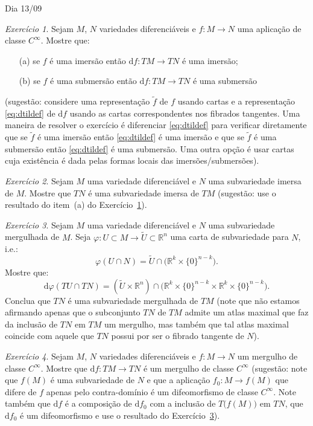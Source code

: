 \documentclass[oneside,11pt]{amsart}
\newcommand{\R}{\mathds R}
\newcommand{\dd}{\mathrm d}
\theoremstyle{remark}\newtheorem{exercise}{Exercício}[section]
\theoremstyle{plain}\newtheorem{teo}{Teorema}[section]
\theoremstyle{plain}\newtheorem{lem}[teo]{Lema}
\theoremstyle{plain}\newtheorem{prop}[teo]{Proposição}
\theoremstyle{definition}\newtheorem{defin}[teo]{Definição}
\theoremstyle{remark}\newtheorem{rem}[teo]{Observação}
\theoremstyle{definition}\newtheorem{example}[teo]{Exemplo}
\numberwithin{equation}{section}
\begin{document}
\begin{section}{Dia 13/09}
\begin{exercise}\label{exe:dimersubmer}
Sejam $M$, $N$ variedades diferenciáveis e $f:M\to N$ uma aplicação de classe $C^\infty$. Mostre que:
\begin{itemize}
\item[(a)] se $f$ é uma imersão então $\dd f:TM\to TN$ é uma imersão;
\item[(b)] se $f$ é uma submersão então $\dd f:TM\to TN$ é uma submersão
\end{itemize}
(sugestão: considere uma representação $\tilde f$ de $f$ usando cartas e a representação \eqref{eq:dtildef} de $\dd f$ usando as cartas correspondentes
nos fibrados tangentes. Uma maneira de resolver o exercício é diferenciar \eqref{eq:dtildef} para verificar diretamente que se $\tilde f$ é uma imersão
então \eqref{eq:dtildef} é uma imersão e que se $\tilde f$ é uma submersão então \eqref{eq:dtildef} é uma submersão. Uma outra opção é usar cartas cuja existência
é dada pelas formas locais das imersões/submersões).
\end{exercise}

\begin{exercise}
Sejam $M$ uma variedade diferenciável e $N$ uma subvariedade imersa de $M$. Mostre que $TN$ é uma subvariedade imersa de $TM$ (sugestão:
use o resultado do item~(a) do Exercício~\ref{exe:dimersubmer}).
\end{exercise}

\begin{exercise}\label{exe:Tsubvar}
Sejam $M$ uma variedade diferenciável e $N$ uma subvariedade mergulhada de $M$. Seja $\varphi:U\subset M\to\widetilde U\subset\R^n$ uma carta de subvariedade
para $N$, i.e.:
\[\varphi(U\cap N)=\widetilde U\cap\big(\R^k\times\{0\}^{n-k}\big).\]
Mostre que:
\[\dd\varphi(TU\cap TN)=(\widetilde U\times\R^n)\cap\big(\R^k\times\{0\}^{n-k}\times\R^k\times\{0\}^{n-k}\big).\]
Conclua que $TN$ é uma subvariedade mergulhada de $TM$ (note que não estamos afirmando apenas que o subconjunto $TN$ de $TM$ admite um atlas maximal
que faz da inclusão de $TN$ em $TM$ um mergulho, mas também que tal atlas maximal coincide com aquele que $TN$ possui por ser o fibrado tangente de $N$).
\end{exercise}

\begin{exercise}\label{exe:dmergulho}
Sejam $M$, $N$ variedades diferenciáveis e $f:M\to N$ um mergulho de classe $C^\infty$. Mostre que $\dd f:TM\to TN$ é um mergulho de classe $C^\infty$
(sugestão: note que $f(M)$ é uma subvariedade de $N$ e que a aplicação $f_0:M\to f(M)$ que difere de $f$ apenas pelo contra-domínio é um difeomorfismo de classe
$C^\infty$. Note também que $\dd f$ é a composição de $\dd f_0$ com a inclusão de $T\big(f(M)\big)$ em $TN$, que
$\dd f_0$ é um difeomorfismo e use o resultado do Exercício~\ref{exe:Tsubvar}).
\end{exercise}


\end{section}
\end{document}
